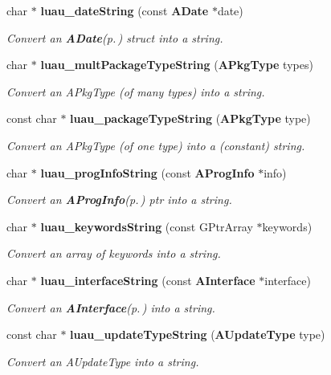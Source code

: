 \begin{CompactItemize}
char $\ast$ {\bf luau\_\-date\-String} (const {\bf ADate} $\ast$date)
\begin{CompactList}\small\item\em Convert an {\bf ADate}{\rm (p.\,\pageref{structADate})} struct into a string. \item\end{CompactList}\item 
char $\ast$ {\bf luau\_\-mult\-Package\-Type\-String} ({\bf APkg\-Type} types)
\begin{CompactList}\small\item\em Convert an APkg\-Type (of many types) into a string. \item\end{CompactList}\item 
const char $\ast$ {\bf luau\_\-package\-Type\-String} ({\bf APkg\-Type} type)
\begin{CompactList}\small\item\em Convert an APkg\-Type (of one type) into a (constant) string. \item\end{CompactList}\item 
char $\ast$ {\bf luau\_\-prog\-Info\-String} (const {\bf AProg\-Info} $\ast$info)
\begin{CompactList}\small\item\em Convert an {\bf AProg\-Info}{\rm (p.\,\pageref{structAProgInfo})} ptr into a string. \item\end{CompactList}\item 
char $\ast$ {\bf luau\_\-keywords\-String} (const GPtr\-Array $\ast$keywords)
\begin{CompactList}\small\item\em Convert an array of keywords into a string. \item\end{CompactList}\item 
char $\ast$ {\bf luau\_\-interface\-String} (const {\bf AInterface} $\ast$interface)
\begin{CompactList}\small\item\em Convert an {\bf AInterface}{\rm (p.\,\pageref{structAInterface})} into a string. \item\end{CompactList}\item 
const char $\ast$ {\bf luau\_\-update\-Type\-String} ({\bf AUpdate\-Type} type)
\begin{CompactList}\small\item\em Convert an AUpdate\-Type into a string. \item\end{CompactList}\item 

\end{CompactItemize}
